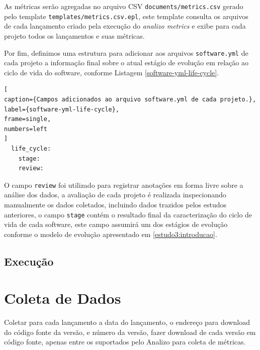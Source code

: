 As métricas serão agregadas no arquivo CSV \texttt{documents/metrics.csv}
gerado pelo template \texttt{templates/metrics.csv.epl}, este template consulta
os arquivos de cada lançamento criado pela execução do {\it analizo metrics}
e exibe para cada projeto todos os lançamentos e suas métricas.

Por fim, definimos uma estrutura para adicionar aos arquivos \texttt{software.yml} de
cada projeto a informação final sobre o atual estágio de evolução em relação ao
ciclo de vida do software, conforme Listagem \ref{software-yml-life-cycle}.

\begin{lstlisting}[
caption={Campos adicionados ao arquivo software.yml de cada projeto.},
label={software-yml-life-cycle},
frame=single,
numbers=left
]
  life_cycle:
    stage:
    review:
\end{lstlisting}

O campo \texttt{review} foi utilizado para registrar anotações em forma livre
sobre a análise dos dados, a avaliação de cada projeto é realizada
inspecionando manualmente os dados coletados, incluindo dados trazidos pelos
estudos anteriores, o campo \texttt{stage} contém o resultado final da
caracterização do ciclo de vida de cada software, este campo assumirá um dos
estágios de evolução conforme o modelo de evolução apresentado em
\ref{estudo3:introducao}.




\subsection{Execução}

\section{Coleta de Dados} \label{estudo3:coleta}

Coletar para cada lançamento a data do lançamento, o endereço para download
do código fonte da versão, e número da versão, fazer download de cada versão
em código fonte, apenas entre os suportados pelo Analizo para coleta de métricas.

